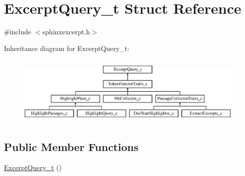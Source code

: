 \hypertarget{structExcerptQuery__t}{\section{Excerpt\-Query\-\_\-t Struct Reference}
\label{structExcerptQuery__t}
}


{\ttfamily \#include $<$sphinxexcerpt.\-h$>$}

Inheritance diagram for Excerpt\-Query\-\_\-t\-:\begin{figure}[H]
\begin{center}
\leavevmode
\includegraphics[height=3.414634cm]{structExcerptQuery__t}
\end{center}
\end{figure}
\subsection*{Public Member Functions}
\begin{DoxyCompactItemize}
\item 
\hyperlink{structExcerptQuery__t_ab868eb61f0aea84718940aee05ca54de}{Excerpt\-Query\-\_\-t} ()
\end{DoxyCompactItemize}
